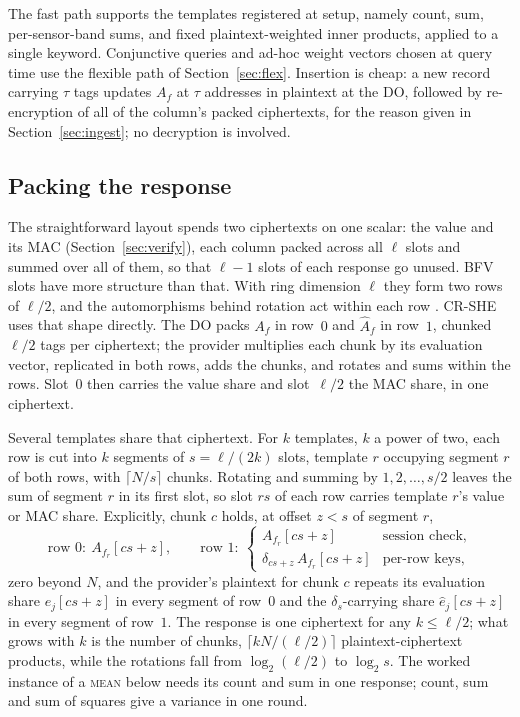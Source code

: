 \documentclass[a4paper,fleqn]{cas-sc}
\begin{document}
The fast path supports the templates registered at setup, namely count, sum,
per-sensor-band sums, and fixed plaintext-weighted inner products, applied to
a single keyword. Conjunctive queries and ad-hoc weight vectors chosen at
query time use the flexible path of Section~\ref{sec:flex}. Insertion is
cheap: a new record carrying $\tau$ tags updates $A_f$ at $\tau$ addresses in
plaintext at the DO, followed by re-encryption of all of the column's packed
ciphertexts, for the reason given in Section~\ref{sec:ingest}; no decryption
is involved.

\subsection{Packing the response}
\label{sec:packing}
The straightforward layout spends two ciphertexts on one scalar: the value and its MAC
(Section~\ref{sec:verify}), each column packed across all $\ell$ slots and
summed over all of them, so that $\ell-1$ slots of each response go unused.
BFV slots have more structure than that. With ring dimension $\ell$ they form
two rows of $\ell/2$, and the automorphisms behind rotation act within each row
\citep{halevi2014algorithms}. CR-SHE uses that shape directly. The DO packs
$A_f$ in row~$0$ and $\widehat{A}_f$ in row~$1$, chunked $\ell/2$ tags per
ciphertext; the provider multiplies each chunk by its evaluation vector,
replicated in both rows, adds the chunks, and rotates and sums within the rows.
Slot~$0$ then carries the value share and slot~$\ell/2$ the MAC share, in one
ciphertext.

Several templates share that ciphertext. For $k$ templates, $k$ a power of
two, each row is cut into $k$ segments of $s=\ell/(2k)$ slots, template $r$
occupying segment $r$ of both rows, with $\lceil N/s\rceil$ chunks. Rotating
and summing by $1,2,\dots,s/2$ leaves the sum of segment $r$ in its first slot,
so slot $rs$ of each row carries template $r$'s value or MAC share.
Explicitly, chunk $c$ holds, at offset $z<s$ of segment $r$,
\[
\text{row }0:\ A_{f_r}[cs+z],\qquad
\text{row }1:\ \begin{cases}A_{f_r}[cs+z] & \text{session check},\\
\delta_{cs+z}\,A_{f_r}[cs+z] & \text{per-row keys},\end{cases}
\]
zero beyond $N$, and the provider's plaintext for chunk $c$ repeats its
evaluation share $e_j[cs+z]$ in every segment of row~$0$ and the
$\delta_s$-carrying share $\hat e_j[cs+z]$ in every segment of row~$1$. The
response is one ciphertext for any $k\le\ell/2$; what grows with $k$ is the
number of chunks, $\lceil kN/(\ell/2)\rceil$ plaintext-ciphertext products,
while the rotations fall from $\log_2(\ell/2)$ to $\log_2 s$. The worked
instance of a \textsc{mean} below needs its count and sum in one response;
count, sum and sum of squares give a variance in one round.
\end{document}
